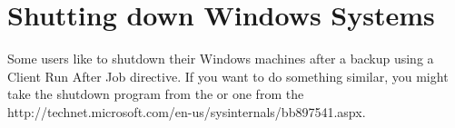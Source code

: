 \section{Shutting down Windows Systems}

Some users like to shutdown their Windows machines after a backup using a
Client Run After Job directive. If you want to do something similar, you might
take the shutdown program from the 
 or one from the 
{http://technet.microsoft.com/en-us/sysinternals/bb897541.aspx}.
